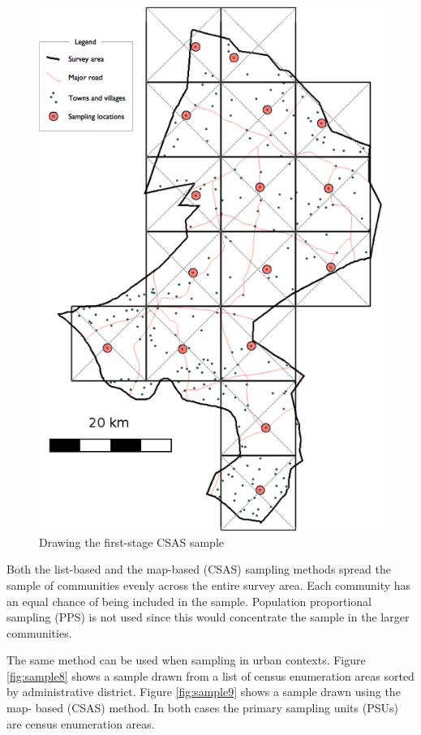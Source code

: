 \documentclass[12pt,a4paper]{book}
\theoremstyle{definition}
\theoremstyle{definition}
\theoremstyle{definition}
\theoremstyle{remark}
\begin{document}
\begin{figure}[H]

{\centering \includegraphics[width=6.97in]{figures/mapSample3} 

}

\caption{Drawing the first-stage CSAS sample}\label{fig:sample7}
\end{figure}

Both the list-based and the map-based (CSAS) sampling methods spread the
sample of communities evenly across the entire survey area. Each
community has an equal chance of being included in the sample.
Population proportional sampling (PPS) is not used since this would
concentrate the sample in the larger communities.

The same method can be used when sampling in urban contexts. Figure
\ref{fig:sample8} shows a sample drawn from a list of census enumeration
areas sorted by administrative district. Figure \ref{fig:sample9} shows
a sample drawn using the map- based (CSAS) method. In both cases the
primary sampling units (PSUs) are census enumeration areas.
\end{document}
